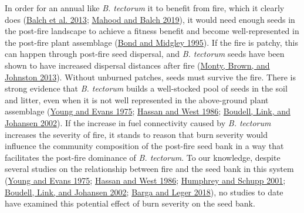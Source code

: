 \documentclass[
  12pt,
]{article}
\begin{document}
In order for an annual like \emph{B. tectorum} it to benefit from fire,
which it clearly does (\protect\hyperlink{ref-Balch2013}{Balch et al.
2013}; \protect\hyperlink{ref-Mahood2019}{Mahood and Balch 2019}), it
would need enough seeds in the post-fire landscape to achieve a fitness
benefit and become well-represented in the post-fire plant assemblage
(\protect\hyperlink{ref-Bond1995}{Bond and Midgley 1995}). If the fire
is patchy, this can happen through post-fire seed dispersal, and
\emph{B. tectorum} seeds have been shown to have increased dispersal
distances after fire (\protect\hyperlink{ref-Monty2013}{Monty, Brown,
and Johnston 2013}). Without unburned patches, seeds must survive the
fire. There is strong evidence that \emph{B. tectorum} builds a
well-stocked pool of seeds in the soil and litter, even when it is not
well represented in the above-ground plant assemblage
(\protect\hyperlink{ref-Young1975}{Young and Evans 1975};
\protect\hyperlink{ref-Hassan1986}{Hassan and West 1986};
\protect\hyperlink{ref-Boudell2002}{Boudell, Link, and Johansen 2002}).
If the increase in fuel connectivity caused by \emph{B. tectorum}
increases the severity of fire, it stands to reason that burn severity
would influence the community composition of the post-fire seed bank in
a way that facilitates the post-fire dominance of \emph{B. tectorum}. To
our knowledge, despite several studies on the relationship between fire
and the seed bank in this system
(\protect\hyperlink{ref-Young1975}{Young and Evans 1975};
\protect\hyperlink{ref-Hassan1986}{Hassan and West 1986};
\protect\hyperlink{ref-Humphrey2001}{Humphrey and Schupp 2001};
\protect\hyperlink{ref-Boudell2002}{Boudell, Link, and Johansen 2002};
\protect\hyperlink{ref-Barga2018}{Barga and Leger 2018}), no studies to
date have examined this potential effect of burn severity on the seed
bank.
\end{document}
